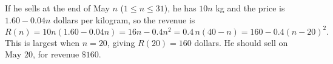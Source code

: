 If he sells at the end of May $n$ ($1\le n\le31$), he has $10n$ kg and the price is $1.60-0.04n$ dollars per kilogram, so the revenue is
\[
R(n)=10n(1.60-0.04n)=16n-0.4n^2=0.4\,n(40-n)=160-0.4(n-20)^2 .
\]
This is largest when $n=20$, giving $R(20)=160$ dollars. He should sell on $\boxed{\text{May }20}$, for revenue $\$160$.
